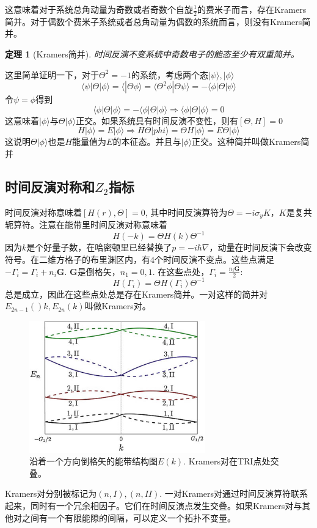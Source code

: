 \documentclass{article}
\numberwithin{equation}{subsection}
\newtheorem{theorem}{定理}
\begin{document}
这意味着对于系统总角动量为奇数或者奇数个自旋$\frac{1}{2}$的费米子而言，存在Kramers简并。对于偶数个费米子系统或者总角动量为偶数的系统而言，则没有Kramers简并。
\begin{theorem}[Kramers简并]
    时间反演不变系统中奇数电子的能态至少有双重简并。
\end{theorem}
这里简单证明一下，对于$\Theta^2=-1$的系统，考虑两个态$|\psi\rangle,|\phi\rangle$
\begin{equation}
    \langle\psi|\Theta|\phi\rangle=\langle|\Theta\phi\rangle=\langle\Theta^2\phi|\Theta\psi\rangle=-\langle\phi|\Theta|\psi\rangle
\end{equation}
令$\psi=\phi$得到
\begin{equation}
    \langle\phi|\Theta|\phi\rangle=-\langle\phi|\Theta|\phi\rangle\Rightarrow\langle\phi|\Theta|\phi\rangle=0
\end{equation}
这意味着$|\phi\rangle$与$\Theta|\phi\rangle$正交。如果系统具有时间反演不变性，则有$[\Theta,H]=0$
\begin{equation}
    H|\phi\rangle=E|\phi\rangle\Rightarrow H\Theta|phi\rangle=\Theta H|\phi\rangle=E\Theta|\phi\rangle
\end{equation}
这说明$\Theta|\phi\rangle$也是$H$能量值为$E$的本征态。并且与$|\phi\rangle$正交。这种简并叫做Kramers简并
\subsection{时间反演对称和$Z_2$指标}
时间反演对称意味着$[H(r),\Theta]=0$, 其中时间反演算符为$\Theta=-i\sigma_y K$，$K$是复共轭算符。注意在能带里时间反演对称意味着
\begin{equation}
    H(-k)=\Theta H(k)\Theta^{-1}
\end{equation}
因为$k$是个好量子数，在哈密顿里已经替换了$p=-i\hbar\nabla$，动量在时间反演下会改变符号。在二维方格子的布里渊区内，有$4$个时间反演不变点。这些点满足$-\Gamma_i=\Gamma_i+n_i\mathbf{G}$. $\mathbf{G}$是倒格矢，$n_1=0,1$. 在这些点处，$\Gamma_i=\frac{n_i\mathbf{G}}{2}$:
\begin{equation}
    H(\Gamma_i)=\Theta H(\Gamma_i)\Theta^{-1}
\end{equation}
总是成立，因此在这些点处总是存在Kramers简并。一对这样的简并对$E_{2n-1}()k,E_{2n}(k)$叫做Kramers对。
\begin{figure}[h]
    \centering
    \includegraphics[width=3in]{Kramers.png}
    \caption{沿着一个方向倒格矢的能带结构图$E(k)$. Kramers对在TRI点处交叠。}\label{Kramers pairs}
\end{figure}
Kramers对分别被标记为$(n,I),(n,II)$. 一对Kramers对通过时间反演算符联系起来，同时有一个冗余相因子。它们在时间反演点发生交叠。如果Kramers对与其他对之间有一个有限能隙的间隔，可以定义一个拓扑不变量。
\end{document}

